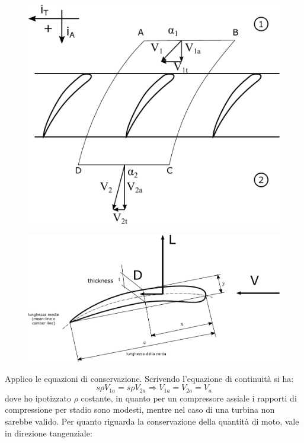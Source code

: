 \begin{figure}
\centering
\begin{minipage}{.4\textwidth}
  \centering
  \includegraphics[width=.95\linewidth]{fig/schiera1.pdf}
  \label{fig:schiera1}
\end{minipage}%
\begin{minipage}{.6\textwidth}
  \centering
  \includegraphics[width=.85\linewidth]{fig/LDref.pdf}
  \label{fig:LDref}
\end{minipage}
\end{figure}
Applico le equazioni di conservazione. 
Scrivendo l'equazione di continuità si ha:
\begin{equation}
s \rho V_{1a} = s \rho V_{2a} \Rightarrow V_{1a} = V_{2a} = V_a
\end{equation}
dove ho ipotizzato $\rho$ costante, in quanto per un compressore assiale i rapporti di compressione per stadio sono modesti, mentre nel caso di una turbina non sarebbe valido. Per quanto riguarda la conservazione della quantità di moto, vale in direzione tangenziale:
